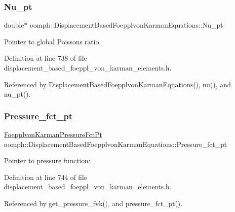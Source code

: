 \subsubsection{\texorpdfstring{Nu\+\_\+pt}{Nu\_pt}}
{\footnotesize\ttfamily double$\ast$ oomph\+::\+Displacement\+Based\+Foepplvon\+Karman\+Equations\+::\+Nu\+\_\+pt\hspace{0.3cm}{\ttfamily [protected]}}



Pointer to global Poisson\textquotesingle{}s ratio. 



Definition at line 738 of file displacement\+\_\+based\+\_\+foeppl\+\_\+von\+\_\+karman\+\_\+elements.\+h.



Referenced by Displacement\+Based\+Foepplvon\+Karman\+Equations(), nu(), and nu\+\_\+pt().

\mbox{\label{classoomph_1_1DisplacementBasedFoepplvonKarmanEquations_a6cb9ee1c546aad3a331b8eff4703613c}} 
\subsubsection{\texorpdfstring{Pressure\+\_\+fct\+\_\+pt}{Pressure\_fct\_pt}}
{\footnotesize\ttfamily \hyperlink{classoomph_1_1DisplacementBasedFoepplvonKarmanEquations_a9d63b92b57e3b521a5a10cecdafc4e65}{Foepplvon\+Karman\+Pressure\+Fct\+Pt} oomph\+::\+Displacement\+Based\+Foepplvon\+Karman\+Equations\+::\+Pressure\+\_\+fct\+\_\+pt\hspace{0.3cm}{\ttfamily [protected]}}



Pointer to pressure function\+: 



Definition at line 744 of file displacement\+\_\+based\+\_\+foeppl\+\_\+von\+\_\+karman\+\_\+elements.\+h.



Referenced by get\+\_\+pressure\+\_\+fvk(), and pressure\+\_\+fct\+\_\+pt().

